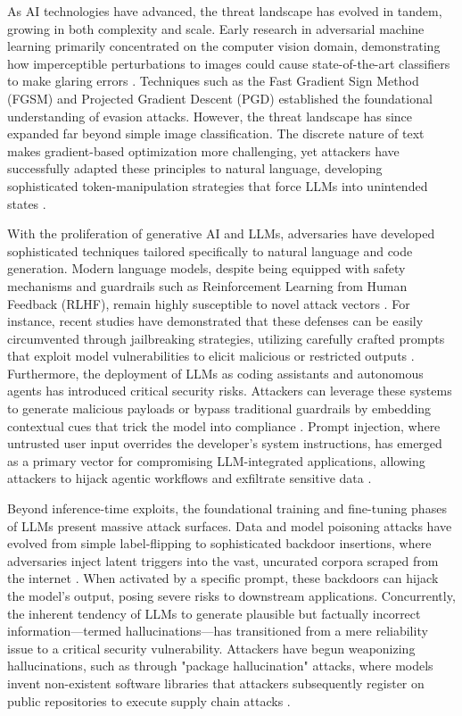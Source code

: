 \documentclass[11pt,a4paper]{article}
\begin{document}
As AI technologies have advanced, the threat landscape has evolved in tandem, growing in both complexity and scale. Early research in adversarial machine learning primarily concentrated on the computer vision domain, demonstrating how imperceptible perturbations to images could cause state-of-the-art classifiers to make glaring errors . Techniques such as the Fast Gradient Sign Method (FGSM) and Projected Gradient Descent (PGD) established the foundational understanding of evasion attacks. However, the threat landscape has since expanded far beyond simple image classification. The discrete nature of text makes gradient-based optimization more challenging, yet attackers have successfully adapted these principles to natural language, developing sophisticated token-manipulation strategies that force LLMs into unintended states .

With the proliferation of generative AI and LLMs, adversaries have developed sophisticated techniques tailored specifically to natural language and code generation. Modern language models, despite being equipped with safety mechanisms and guardrails such as Reinforcement Learning from Human Feedback (RLHF), remain highly susceptible to novel attack vectors . For instance, recent studies have demonstrated that these defenses can be easily circumvented through jailbreaking strategies, utilizing carefully crafted prompts that exploit model vulnerabilities to elicit malicious or restricted outputs \cite{Muntasir_2025_Mocha}. Furthermore, the deployment of LLMs as coding assistants and autonomous agents has introduced critical security risks. Attackers can leverage these systems to generate malicious payloads or bypass traditional guardrails by embedding contextual cues that trick the model into compliance \cite{Noever_2024_AI}. Prompt injection, where untrusted user input overrides the developer's system instructions, has emerged as a primary vector for compromising LLM-integrated applications, allowing attackers to hijack agentic workflows and exfiltrate sensitive data .

Beyond inference-time exploits, the foundational training and fine-tuning phases of LLMs present massive attack surfaces. Data and model poisoning attacks have evolved from simple label-flipping to sophisticated backdoor insertions, where adversaries inject latent triggers into the vast, uncurated corpora scraped from the internet . When activated by a specific prompt, these backdoors can hijack the model's output, posing severe risks to downstream applications. Concurrently, the inherent tendency of LLMs to generate plausible but factually incorrect information---termed hallucinations---has transitioned from a mere reliability issue to a critical security vulnerability. Attackers have begun weaponizing hallucinations, such as through "package hallucination" attacks, where models invent non-existent software libraries that attackers subsequently register on public repositories to execute supply chain attacks .
\end{document}

